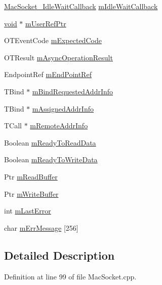\begin{DoxyCompactItemize}
\item 
\hyperlink{_mac_socket_8h_a3de3c9c68d7cdefacdabc4cb07ac8a15}{Mac\+Socket\+\_\+\+Idle\+Wait\+Callback} \hyperlink{struct_socket_struct_a69f986725d1044656cb7cc5c6604f3b7}{m\+Idle\+Wait\+Callback}
\item 
\hyperlink{hw__4758__cca_8h_afad4d591c7931ff6dc5bf69c76c96aa0}{void} $\ast$ \hyperlink{struct_socket_struct_ad4f85b13ba101a9d94dfdf6ad4bae473}{m\+User\+Ref\+Ptr}
\item 
O\+T\+Event\+Code \hyperlink{struct_socket_struct_a7c7606344b0597bdd61bd1c945689c0a}{m\+Expected\+Code}
\item 
O\+T\+Result \hyperlink{struct_socket_struct_a94731da6743b8173762a07657f1b0b1f}{m\+Async\+Operation\+Result}
\item 
Endpoint\+Ref \hyperlink{struct_socket_struct_aa7508a8f247a125cafcf3ad164c6912c}{m\+End\+Point\+Ref}
\item 
T\+Bind $\ast$ \hyperlink{struct_socket_struct_a2bb0e26ca8f37a048829a12a0906c003}{m\+Bind\+Requested\+Addr\+Info}
\item 
T\+Bind $\ast$ \hyperlink{struct_socket_struct_a65e6ebf0a795e33a6537fb27d8afc23b}{m\+Assigned\+Addr\+Info}
\item 
T\+Call $\ast$ \hyperlink{struct_socket_struct_ad26a6adec64806cda0086fa72c35f1c0}{m\+Remote\+Addr\+Info}
\item 
Boolean \hyperlink{struct_socket_struct_a320335f070710aec849244a9482825ef}{m\+Ready\+To\+Read\+Data}
\item 
Boolean \hyperlink{struct_socket_struct_a370e97eda35fa575c62958ee6870def7}{m\+Ready\+To\+Write\+Data}
\item 
Ptr \hyperlink{struct_socket_struct_a56cfa450b74af24f4dfaf0d3a7e8e7fd}{m\+Read\+Buffer}
\item 
Ptr \hyperlink{struct_socket_struct_ae1ad30ca15731809b70008064459b4d7}{m\+Write\+Buffer}
\item 
int \hyperlink{struct_socket_struct_a1b6ada1030d74c096be4da81d64f7958}{m\+Last\+Error}
\item 
char \hyperlink{struct_socket_struct_a113aebf6f923d429a5ac322124a70d90}{m\+Err\+Message} \mbox{[}256\mbox{]}
\end{DoxyCompactItemize}


\subsection{Detailed Description}


Definition at line 99 of file Mac\+Socket.\+cpp.



